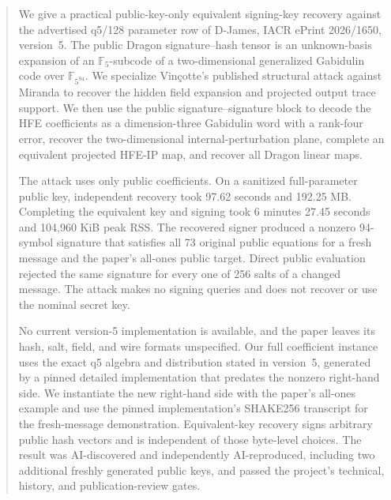 \documentclass[10pt,a4paper]{article}
\newcommand{\F}{\mathbb{F}}
\begin{document}
\begin{abstract}
We give a practical public-key-only equivalent signing-key recovery against
the advertised q5/128 parameter row of D-James, IACR ePrint 2026/1650,
version~5.  The public Dragon signature--hash tensor is an unknown-basis
expansion of an $\F_5$-subcode of a two-dimensional generalized Gabidulin
code over $\F_{5^{94}}$.  We specialize Vin\c{c}otte's published structural
attack against Miranda to recover the hidden field expansion and projected
output trace support.  We then use the public signature--signature block to
decode the HFE coefficients as a dimension-three Gabidulin word with a
rank-four error, recover the two-dimensional internal-perturbation plane,
complete an equivalent projected HFE-IP map, and recover all Dragon linear
maps.

The attack uses only public coefficients.  On a sanitized full-parameter
public key, independent recovery took 97.62 seconds and 192.25 MB.  Completing
the equivalent key and signing took 6 minutes 27.45 seconds and 104,960 KiB
peak RSS.  The recovered signer produced a nonzero 94-symbol signature that
satisfies all 73 original public equations for a fresh message and the
paper's all-ones public target.  Direct public evaluation rejected the same
signature for every one of 256 salts of a changed message.  The attack makes
no signing queries and does not recover or use the nominal secret key.

No current version-5 implementation is available, and the paper leaves its
hash, salt, field, and wire formats unspecified.  Our full coefficient
instance uses the exact q5 algebra and distribution stated in version~5,
generated by a pinned detailed implementation that predates the nonzero
right-hand side.  We instantiate the new right-hand side with the paper's
all-ones example and use the pinned implementation's SHAKE256 transcript for
the fresh-message demonstration.  Equivalent-key recovery signs arbitrary
public hash vectors and is independent of those byte-level choices.  The
result was AI-discovered and independently AI-reproduced, including two
additional freshly generated public keys, and passed the project's technical,
history, and publication-review gates.
\end{abstract}

\noindent{}
\end{document}
